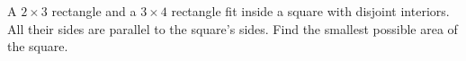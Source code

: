 A $2\times3$ rectangle and a $3\times4$ rectangle fit inside a square with disjoint interiors. All their sides are parallel to the square's sides. Find the smallest possible area of the square.
